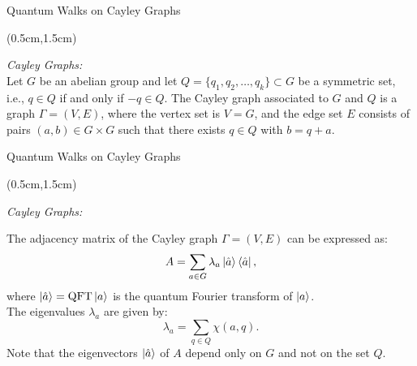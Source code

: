 \documentclass{beamer}
\theoremstyle{definition}
\begin{document}
\begin{frame}{Quantum Walks on Cayley Graphs}
    
    \begin{textblock*}{12cm}(0.5cm,1.5cm)
        
        \textit{Cayley Graphs:} \\
        \vspace{0.3cm}
        Let $G$ be an abelian group and let $Q = \{q_1, q_2, \dots, q_k\} \subset G$ be a symmetric set, i.e., $q \in Q$ if and only if $-q \in Q$. The Cayley graph associated to $G$ and $Q$ is a graph $\Gamma = (V, E)$, where the vertex set is $V = G$, and the edge set $E$ consists of pairs $(a, b) \in G \times G$ such that there exists $q \in Q$ with $b = q + a$. \\
      
    \end{textblock*}

\end{frame}



\begin{frame}{Quantum Walks on Cayley Graphs}
    
    \begin{textblock*}{12cm}(0.5cm,1.5cm)
        
        \textit{Cayley Graphs:} \\
        \vspace{0.3cm}
        
        The adjacency matrix of the Cayley graph $\Gamma = (V,E)$ can be expressed as:
        \[ A = \sum_{a \in G} \lambda_a \ket{\hat{a}} \bra{\hat{a}}, \]
        where $\ket{\hat{a}} = \operatorname{QFT} \ket{a}$ is the quantum Fourier transform of $\ket{a}$. \\
         \vspace{0.5cm}
        The eigenvalues $\lambda_a$ are given by:
        \[ \lambda_a = \sum_{q \in Q} \chi(a, q). \]
        Note that the eigenvectors $\ket{\hat{a}}$ of $A$ depend only on $G$ and not on the set $Q$.
    
    \end{textblock*}


\end{frame}
\end{document}
